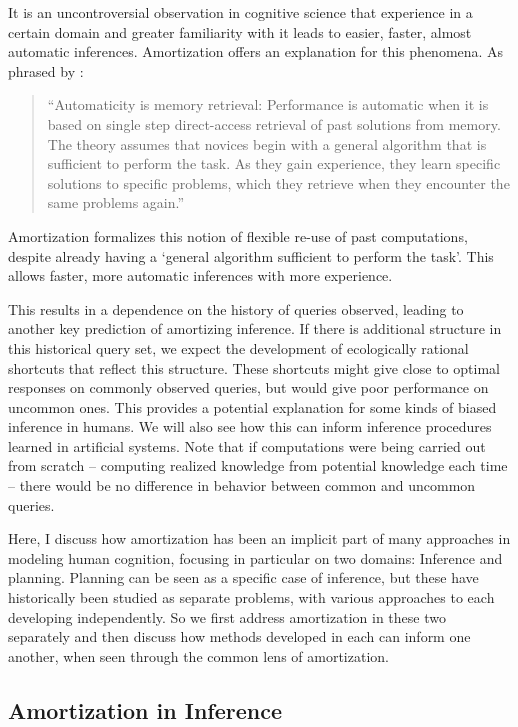 It is an uncontroversial observation in cognitive science that experience in a certain domain and greater familiarity with it leads to easier, faster, almost automatic inferences. Amortization offers an explanation for this phenomena. As phrased by \citet{logan1988toward}:
\begin{quote}
``Automaticity is memory retrieval: Performance is automatic when it is based on single step direct-access retrieval of past solutions from memory. The theory assumes that novices begin with a general algorithm that is sufficient to perform the task. As they gain experience, they learn specific solutions to specific problems, which they retrieve when they encounter the same problems again.''
\end{quote}
Amortization formalizes this notion of flexible re-use of past computations, despite already having a `general algorithm sufficient to perform the task'. This allows faster, more automatic inferences with more experience.

This results in a dependence on the history of queries observed, leading to another key prediction of amortizing inference. If there is additional structure in this historical query set, we expect the development of ecologically rational shortcuts that reflect this structure. These shortcuts might give close to optimal responses on commonly observed queries, but would give poor performance on uncommon ones. This provides a potential explanation for some kinds of biased inference in humans. We will also see how this can inform inference procedures learned in artificial systems. Note that if computations were being carried out from scratch -- computing realized knowledge from potential knowledge each time -- there would be no difference in behavior between common and uncommon queries.

Here, I discuss how amortization has been an implicit part of many approaches in modeling human cognition, focusing in particular on two domains: Inference and planning. Planning can be seen as a specific case of inference\citep{botvinick2012planning}, but these have historically been studied as separate problems, with various approaches to each developing independently. So we first address amortization in these two separately and then discuss how methods developed in each can inform one another, when seen through the common lens of amortization.

\subsection{Amortization in Inference}

